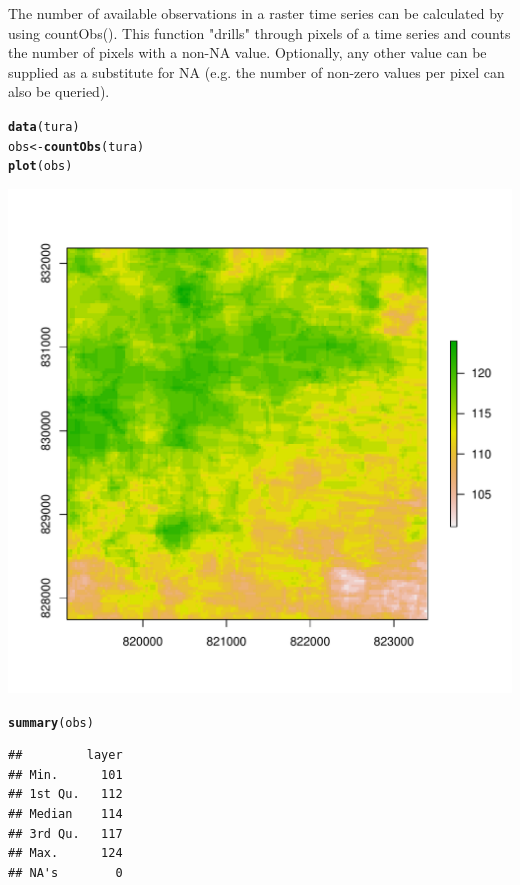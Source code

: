 \documentclass{article}\usepackage[]{graphicx}\usepackage[]{color}
\makeatletter
\def\maxwidth{ %
  \ifdim\Gin@nat@width>\linewidth
    \linewidth
  \else
    \Gin@nat@width
  \fi
}
\newcommand{\hlstd}[1]{\textcolor[rgb]{0.345,0.345,0.345}{#1}}%
\newcommand{\hlkwb}[1]{\textcolor[rgb]{0.69,0.353,0.396}{#1}}%
\newcommand{\hlkwd}[1]{\textcolor[rgb]{0.737,0.353,0.396}{\textbf{#1}}}%
\newenvironment{kframe}{%
 \def\at@end@of@kframe{}%
 \ifinner\ifhmode%
  \def\at@end@of@kframe{\end{minipage}}%
  \begin{minipage}{\columnwidth}%
 \fi\fi%
 \def\FrameCommand##1{\hskip\@totalleftmargin \hskip-\fboxsep
 \colorbox{shadecolor}{##1}\hskip-\fboxsep
     \hskip-\linewidth \hskip-\@totalleftmargin \hskip\columnwidth}%
 \MakeFramed {\advance\hsize-\width
   \@totalleftmargin\z@ \linewidth\hsize
   \@setminipage}}%
 {\par\unskip\endMakeFramed%
 \at@end@of@kframe}
\newenvironment{knitrout}{}{} %
\makeatother
\begin{document}
The number of available observations in a raster time series can be calculated by using countObs(). This function "drills" through pixels of a time series and counts the number of pixels with a non-NA value. Optionally, any other value can be supplied as a substitute for NA (e.g. the number of non-zero values per pixel can also be queried).

\begin{knitrout}
\color{fgcolor}\begin{kframe}
\begin{alltt}
\hlkwd{data}\hlstd{(tura)}
\hlstd{obs} \hlkwb{<-} \hlkwd{countObs}\hlstd{(tura)}
\hlkwd{plot}\hlstd{(obs)}
\end{alltt}
\end{kframe}
\includegraphics[width=\maxwidth]{figure/countObs} 
\begin{kframe}\begin{alltt}
\hlkwd{summary}\hlstd{(obs)}
\end{alltt}
\begin{verbatim}
##         layer
## Min.      101
## 1st Qu.   112
## Median    114
## 3rd Qu.   117
## Max.      124
## NA's        0
\end{verbatim}
\end{kframe}
\end{knitrout}
\end{document}
